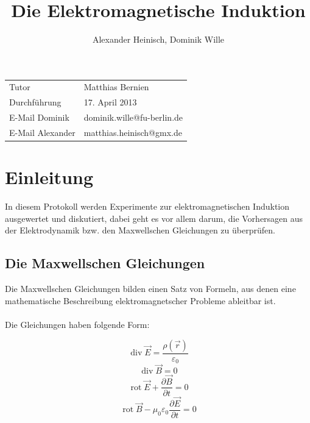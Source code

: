 \documentclass{article}
\title{Die Elektromagnetische Induktion}
\author{Alexander Heinisch, Dominik Wille}
\begin{document}
\maketitle
\vspace{13cm}
\noindent
\begin{tabular}{l l}
Tutor & Matthias Bernien  \\
Durchführung & 17. April 2013 \\

E-Mail Dominik & dominik.wille@fu-berlin.de \\
E-Mail Alexander & matthias.heinisch@gmx.de \\
\end{tabular}

\newpage
\tableofcontents
\newpage

\section{Einleitung}

In diesem Protokoll werden Experimente zur elektromagnetischen Induktion ausgewertet und diskutiert, dabei geht es vor allem darum, die Vorhersagen aus der Elektrodynamik bzw. den {\sc Maxwellschen Gleichungen} zu überprüfen.
 
\subsection{Die Maxwellschen Gleichungen}

Die Maxwellschen Gleichungen bilden einen Satz von Formeln, aus denen eine mathematische Beschreibung elektromagnetscher Probleme ableitbar ist.\\ \\
Die Gleichungen haben folgende Form:

\begin{equation}\label{maxwell1}
\operatorname{div} \vec{E} = \frac{\rho(\vec{r})}{\varepsilon_0}
\end{equation}
\begin{equation}\label{maxwell2}
\operatorname{div} \vec{B} = 0
\end{equation}
\begin{equation}\label{maxwell3}
\operatorname{rot} \vec{E} + \frac{\partial \vec{B}}{\partial t}= 0
\end{equation}
\begin{equation}\label{maxwell4}
\operatorname{rot} \vec{B} - \mu_0 \varepsilon_0 \frac{\partial \vec{E}}{\partial t} = 0
\end{equation}
\end{document}

